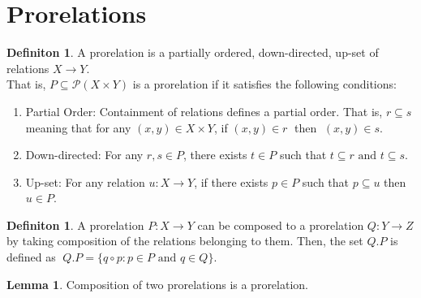 \documentclass[18pt,a4paper]{article}
\theoremstyle{definition}
\newtheorem{definition}[theorem]{Definiton}
\newtheorem{lemma}[theorem]{Lemma}
\begin{document}
\section{Prorelations}

\begin{definition}%
	A prorelation is a partially ordered, down-directed, up-set of relations $X \to Y$.\\
	That is, $P \subseteq \mathcal{P}(X \times Y)$ is a prorelation if it satisfies the
	following conditions:
	\begin{enumerate}[label=(\roman*)]
		\item Partial Order: Containment of relations defines a partial order.
			That is, $r \subseteq s$  meaning that for any $(x,y) \in X \times Y$,
			if  $(x,y)\in r\;$ then $\;(x,y)\in s$.
		\item Down-directed: For any $r,s \in P$, there exists $t \in P $ such that
			$t\subseteq r \text{ and } t \subseteq s$.
		\item Up-set: For any relation $u:X\to Y$, if there exists $p \in P$ such that
			$p \subseteq u $ then $u \in P$.
	\end{enumerate}
\end{definition}
\begin{definition}%
	A prorelation $P:X \to Y$ can be composed to a prorelation $Q:Y \to Z$ by taking
	composition of the relations belonging to them. Then, the set $Q.P$ is defined as
	$\; Q.P=\{q \circ p : p \in P \text{ and } q \in Q  \}$.
\end{definition}
\begin{lemma}
	Composition of two prorelations is a prorelation.
\end{lemma}
\end{document}
